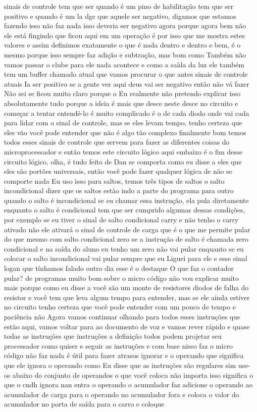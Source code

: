\documentclass[oneside,11pt]{memoir} %
\begin{document}
sinais de controle tem que ser quando  é um pino de habilitação tem que ser  positivo e quando é um la dge que aquele  ser negativo, digamos que estamos fazendo  isso não faz nada isso deveria ser  negativo agora porque agora bem não  ele está fingindo que ficou aqui em um  operação é por isso que me mostra estes  valores e assim definimos  exatamente o que é nada dentro e dentro e  bem, é o mesmo porque isso sempre  faz adição e subtração, mas bom como  Também não vamos passar o clube para ele  nada acontece e como a saída da luz  ele também tem um buffer chamado  atual que vamos procurar o que antes  sinais de controle atuais  Ia ser positivo se a gente ver aqui  deus vai ser negativo então não  vá fazer  Não sei se ficou muito claro porque o  Eu realmente não pretendo explicar isso  absolutamente tudo porque a ideia é mais  que desce neste desce no circuito e  começar a tentar entendê-lo é  muito complicado é o de cada diodo onde  vai cada  para lidar com o sinal de controle, mas se  eles levam tempo, tenho certeza que eles vão  você pode entender que não é algo tão complexo  finalmente bom temos todos esses  sinais de controle que servem para fazer  as diferentes coisas do microprocessador  e então temos este circuito lógico  aqui embaixo é o fim desse circuito  lógico, olha, é tudo feito de  Dan se comporta como eu disse a eles que eles são  portões universais, então você pode  fazer qualquer lógica de  não se comporte nada  Eu uso isso para saltos, temos três  tipos de saltos o salto incondicional  dizer que os saltos estão indo a parte  do programa para outro quando o salto é  incondicional  se eu chamar essa instrução, ela pula  diretamente enquanto o  salto é condicional tem que ser cumprido  algumas dessas condições, por exemplo  se eu tiver o sinal de salto  condicional  carry e não tenho o carry ativado não  ele ativará o sinal de controle de carga  que é o que me permite pular do que  mesmo com salto condicional zero se  a instrução de salto é chamada  zero condicional e na saída do  aluno eu tenho um zero não vai pular  enquanto se eu colocar o salto  incondicional vai pular sempre que eu  Liguei para ele e esse sinal logan que tínhamos  falado outro dia esse é o destaque  O que faz o contador pular?  de programas  muito bom sobre o micro código não vou  explicar muito mais porque como eu disse a você  são um monte de resistores  diodos de falha do resistor e você tem que  leva algum tempo para entender, mas  se ele ainda estiver no circuito tenho certeza que  você pode entender com um pouco de tempo  e paciência não  Agora vamos continuar olhando para todos esses  instruções que estão aqui, vamos voltar para  ao documento de voz e vamos rever  rápido e quase todas as instruções que  instruções a definição  todos podem projetar seu processador  como quiser e seguir as  instruções e com base nisso faz o  micro código não faz nada é útil para  fazer atrasos ignorar e o operando que  significa que ele ignora o operando como  Eu disse que as instruções são regulares sim  use-os abaixo do conjunto de operandos  o que você coloca não importa isso significa  o que o cndh ignora  nan entra o operando o acumulador faz  adicione o operando ao acumulador de carga  para o operando no acumulador fora e  coloca o valor do acumulador no  porta de saída para o carro e coloque 
\end{document}
